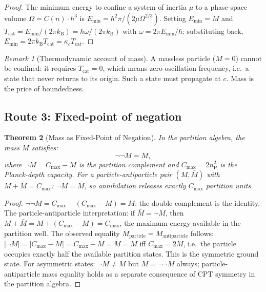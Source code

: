 \documentclass[twocolumn,10pt,a4paper]{article}
\theoremstyle{thmstyle}
\newtheorem{theorem}{Theorem}[section]
\theoremstyle{definition}
\theoremstyle{remark}
\newtheorem{remark}[theorem]{Remark}
\newcommand{\kB}{k_{\mathrm{B}}}
\newcommand{\nP}{n_{\mathrm{P}}}
\newcommand{\Tcat}{T_{\mathrm{cat}}}
\begin{document}
\begin{proof}
The minimum energy to confine a system of inertia $\mu$ to a phase-space
volume $\Omega = C(n)\cdot h^3$ is
$E_{\min} = \hbar^2\pi/(2\mu\Omega^{2/3})$.
Setting $E_{\min} = M$ and $\Tcat = E_{\min}/(2\pi\kB) = \hbar\omega/(2\pi\kB)$
with $\omega = 2\pi E_{\min}/\hbar$: substituting back,
$E_{\min} = 2\pi\kB\Tcat = \kappa_c\Tcat$.
\end{proof}

\begin{remark}[Thermodynamic account of mass]
A massless particle ($M = 0$) cannot be confined: it requires $\Tcat = 0$,
which means zero oscillation frequency, i.e.\ a state that never returns
to its origin. Such a state must propagate at $c$. Mass is the price of
boundedness.
\end{remark}

\subsection{Route 3: Fixed-point of negation}

\begin{theorem}[Mass as Fixed-Point of Negation]
\label{thm:fixed_point}
In the partition algebra, the mass $M$ satisfies:
\begin{equation}
\lnot\lnot M = M,
\label{eq:fixed_point}
\end{equation}
where $\lnot M = C_{\max} - M$ is the partition complement and
$C_{\max} = 2\nP^2$ is the Planck-depth capacity.
For a particle-antiparticle pair $(M, \bar M)$ with $M + \bar M = C_{\max}$:
$\lnot M = \bar M$, so annihilation releases exactly $C_{\max}$ partition
units.
\end{theorem}

\begin{proof}
$\lnot\lnot M = C_{\max} - (C_{\max} - M) = M$: the double complement
is the identity. The particle-antiparticle interpretation: if $\bar M
= \lnot M$, then $M + \bar M = M + (C_{\max} - M) = C_{\max}$,
the maximum energy available in the partition well. The observed equality
$M_{\mathrm{particle}} = M_{\mathrm{antiparticle}}$ follows:
$|\lnot M| = |C_{\max} - M| = C_{\max} - M = \bar M = M$
iff $C_{\max} = 2M$, i.e.\ the particle occupies exactly half the
available partition states. This is the symmetric ground state.
For asymmetric states: $\lnot M \neq M$ but $M = \lnot\lnot M$ always;
particle-antiparticle mass equality holds as a separate consequence
of CPT symmetry in the partition algebra.
\end{proof}
\end{document}
